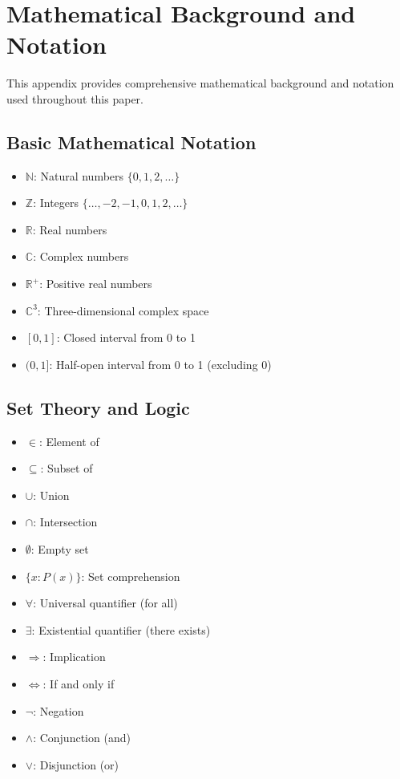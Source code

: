 \section{Mathematical Background and Notation}
\label{app:mathematical-background}

This appendix provides comprehensive mathematical background and notation used throughout this paper.

\subsection{Basic Mathematical Notation}
\begin{itemize}
\item $\mathbb{N}$: Natural numbers $\{0, 1, 2, \ldots\}$
\item $\mathbb{Z}$: Integers $\{\ldots, -2, -1, 0, 1, 2, \ldots\}$
\item $\mathbb{R}$: Real numbers
\item $\mathbb{C}$: Complex numbers
\item $\mathbb{R}^+$: Positive real numbers
\item $\mathbb{C}^3$: Three-dimensional complex space
\item $[0,1]$: Closed interval from 0 to 1
\item $(0,1]$: Half-open interval from 0 to 1 (excluding 0)
\end{itemize}

\subsection{Set Theory and Logic}
\begin{itemize}
\item $\in$: Element of
\item $\subseteq$: Subset of
\item $\cup$: Union
\item $\cap$: Intersection
\item $\emptyset$: Empty set
\item $\{x : P(x)\}$: Set comprehension
\item $\forall$: Universal quantifier (for all)
\item $\exists$: Existential quantifier (there exists)
\item $\Rightarrow$: Implication
\item $\Leftrightarrow$: If and only if
\item $\neg$: Negation
\item $\wedge$: Conjunction (and)
\item $\vee$: Disjunction (or)
\end{itemize}

